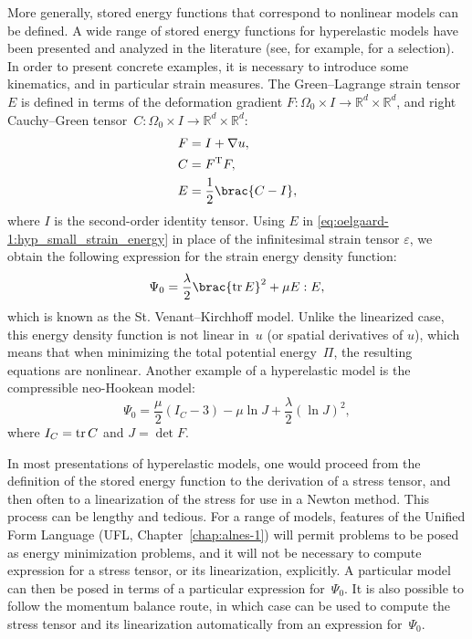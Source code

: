 More generally, stored energy functions that correspond to nonlinear
models can be defined. A wide range of stored energy functions for
hyperelastic models have been presented and analyzed in the literature
(see, for example, \citet{bonet1997} for a selection). In order to
present concrete examples, it is necessary to introduce some kinematics,
and in particular strain measures.  The Green--Lagrange strain tensor
$E$ is defined in terms of the deformation gradient $F : \Omega_{0}
\times I \rightarrow \mathbb{R}^{d} \times \mathbb{R}^{d}$, and right
Cauchy--Green tensor~$C: \Omega_{0} \times I \rightarrow \mathbb{R}^{d}
\times \mathbb{R}^{d}$:
%
\begin{align}
\label{eq:oelgaard-1:hyp_green_strain}
F &= I + \nabla u,
\\
C &= F^{\rm T} F,
\\
E &= \frac{1}{2} \brac{C - I},
\end{align}
%
where $I$ is the second-order identity tensor.  Using $E$ in
\eqref{eq:oelgaard-1:hyp_small_strain_energy} in place of the
infinitesimal strain tensor $\varepsilon$, we obtain the following
expression for the strain energy density function:
%
\begin{equation}
\label{eq:oelgaard-1:hyp_st_venant_kirchhoff}
  \Psi_{0} = \frac{\lambda}{2} \brac{{\rm tr} \, E}^{2} + \mu E:E,
\end{equation}
%
which is known as the St. Venant--Kirchhoff model.  Unlike the linearized
case, this energy density function is not linear in~$u$ (or spatial
derivatives of $u$), which means that when minimizing the total potential
energy~$\Pi$, the resulting equations are nonlinear.  Another example
of a hyperelastic model is the compressible neo-Hookean model:
%
\begin{equation}
\label{eq:oelgaard-1:hyp_neo_hookean}
  \Psi_{0} = \frac{\mu}{2} (I_{C} -3) - \mu \ln J + \frac{\lambda}{2} (\ln J)^{2},
\end{equation}
%
where $I_{C} = {\rm tr} \, C $ and $J = \det F$.

In most presentations of hyperelastic models, one would proceed from the
definition of the stored energy function to the derivation of a stress
tensor, and then often to a linearization of the stress for use in a
Newton method.  This process can be lengthy and tedious. For a range of
models, features of the Unified Form Language (UFL, Chapter~\ref{chap:alnes-1})
will permit problems to be posed as energy
minimization problems, and it will not be necessary to compute expression
for a stress tensor, or its linearization, explicitly. A particular model
can then be posed in terms of a particular expression for~$\Psi_{0}$. It
is also possible to follow the momentum balance route, in which case
\ufl{} can be used to compute the stress tensor and its linearization
automatically from an expression for~$\Psi_{0}$.

